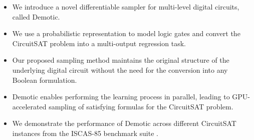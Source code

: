 \begin{itemize}
    \item We introduce a novel differentiable sampler for multi-level digital circuits, called {\sc Demotic}.
    \item We use a probabilistic representation to model logic gates and convert the CircuitSAT problem into a multi-output regression task.
    \item Our proposed sampling method maintains the original structure of the underlying digital circuit without the need for the conversion into any Boolean formulation.
    \item {\sc Demotic} enables performing the learning process in parallel, leading to GPU-accelerated sampling of satisfying formulas for the CircuitSAT problem.
    \item We demonstrate the performance of {\sc Demotic} across different CircuitSAT instances from the ISCAS-85 benchmark suite \cite{Hansen1999ISCASBench}. 
    
\end{itemize}














